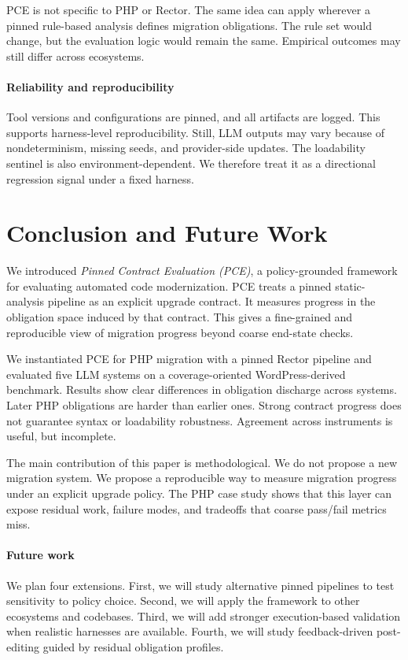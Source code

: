\documentclass[a4paper,UKenglish,cleveref,autoref]{styles/LIPIcs/authors/lipics-v2021}%
\begin{document}
PCE is not specific to PHP or Rector. The same idea can apply wherever a pinned rule-based analysis defines migration obligations. The rule set would change, but the evaluation logic would remain the same. Empirical outcomes may still differ across ecosystems.

\paragraph*{Reliability and reproducibility}
Tool versions and configurations are pinned, and all artifacts are logged. This supports harness-level reproducibility. Still, LLM outputs may vary because of nondeterminism, missing seeds, and provider-side updates. The loadability sentinel is also environment-dependent. We therefore treat it as a directional regression signal under a fixed harness.

\section{Conclusion and Future Work}
\label{sec:conclusion}

We introduced \emph{Pinned Contract Evaluation (PCE)}, a policy-grounded framework for evaluating automated code modernization. PCE treats a pinned static-analysis pipeline as an explicit upgrade contract. It measures progress in the obligation space induced by that contract. This gives a fine-grained and reproducible view of migration progress beyond coarse end-state checks.

We instantiated PCE for PHP migration with a pinned Rector pipeline and evaluated five LLM systems on a coverage-oriented WordPress-derived benchmark. Results show clear differences in obligation discharge across systems. Later PHP obligations are harder than earlier ones. Strong contract progress does not guarantee syntax or loadability robustness. Agreement across instruments is useful, but incomplete.

The main contribution of this paper is methodological. We do not propose a new migration system. We propose a reproducible way to measure migration progress under an explicit upgrade policy. The PHP case study shows that this layer can expose residual work, failure modes, and tradeoffs that coarse pass/fail metrics miss.

\paragraph*{Future work}
We plan four extensions. First, we will study alternative pinned pipelines to test sensitivity to policy choice. Second, we will apply the framework to other ecosystems and codebases. Third, we will add stronger execution-based validation when realistic harnesses are available. Fourth, we will study feedback-driven post-editing guided by residual obligation profiles.
\end{document}

